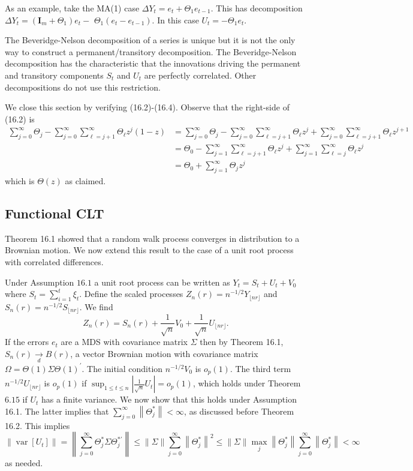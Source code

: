 \documentclass[10pt]{article}
\begin{document}
As an example, take the MA(1) case $\Delta Y_{t}=e_{t}+\Theta_{1} e_{t-1}$. This has decomposition $\Delta Y_{t}=\left(\boldsymbol{I}_{m}+\Theta_{1}\right) e_{t}-$ $\Theta_{1}\left(e_{t}-e_{t-1}\right)$. In this case $U_{t}=-\Theta_{1} e_{t}$.

The Beveridge-Nelson decomposition of a series is unique but it is not the only way to construct a permanent/transitory decomposition. The Beveridge-Nelson decomposition has the characteristic that the innovations driving the permanent and transitory components $S_{t}$ and $U_{t}$ are perfectly correlated. Other decompositions do not use this restriction.

We close this section by verifying (16.2)-(16.4). Observe that the right-side of (16.2) is
$$
\begin{aligned}
\sum_{j=0}^{\infty} \Theta_{j}-\sum_{j=0}^{\infty} \sum_{\ell=j+1}^{\infty} \Theta_{\ell} z^{j}(1-z) &=\sum_{j=0}^{\infty} \Theta_{j}-\sum_{j=0}^{\infty} \sum_{\ell=j+1}^{\infty} \Theta_{\ell} z^{j}+\sum_{j=0}^{\infty} \sum_{\ell=j+1}^{\infty} \Theta_{\ell} z^{j+1} \\
&=\Theta_{0}-\sum_{j=1}^{\infty} \sum_{\ell=j+1}^{\infty} \Theta_{\ell} z^{j}+\sum_{j=1}^{\infty} \sum_{\ell=j}^{\infty} \Theta_{\ell} z^{j} \\
&=\Theta_{0}+\sum_{j=1}^{\infty} \Theta_{j} z^{j}
\end{aligned}
$$
which is $\Theta(z)$ as claimed.

\subsection{Functional CLT}
Theorem 16.1 showed that a random walk process converges in distribution to a Brownian motion. We now extend this result to the case of a unit root process with correlated differences.

Under Assumption $16.1$ a unit root process can be written as $Y_{t}=S_{t}+U_{t}+V_{0}$ where $S_{t}=\sum_{i=1}^{t} \xi_{t}$. Define the scaled processes $Z_{n}(r)=n^{-1 / 2} Y_{\lfloor n r\rfloor}$ and $S_{n}(r)=n^{-1 / 2} S_{\lfloor n r\rfloor}$. We find
$$
Z_{n}(r)=S_{n}(r)+\frac{1}{\sqrt{n}} V_{0}+\frac{1}{\sqrt{n}} U_{\lfloor n r\rfloor} .
$$
If the errors $e_{t}$ are a MDS with covariance matrix $\Sigma$ then by Theorem 16.1, $S_{n}(r) \underset{d}{\longrightarrow} B(r)$, a vector Brownian motion with covariance matrix $\Omega=\Theta(1) \Sigma \Theta(1)^{\prime}$. The initial condition $n^{-1 / 2} V_{0}$ is $o_{p}(1)$. The third term $n^{-1 / 2} U_{\lfloor n r\rfloor}$ is $o_{p}(1)$ if $\sup _{1 \leq t \leq n}\left|\frac{1}{\sqrt{n}} U_{t}\right|=o_{p}(1)$, which holds under Theorem $6.15$ if $U_{t}$ has a finite variance. We now show that this holds under Assumption 16.1. The latter implies that $\sum_{j=0}^{\infty}\left\|\Theta_{j}^{*}\right\|<\infty$, as discussed before Theorem 16.2. This implies
$$
\left\|\operatorname{var}\left[U_{t}\right]\right\|=\left\|\sum_{j=0}^{\infty} \Theta_{j}^{*} \Sigma \Theta_{j}^{* \prime}\right\| \leq\|\Sigma\| \sum_{j=0}^{\infty}\left\|\Theta_{j}^{*}\right\|^{2} \leq\|\Sigma\| \max _{j}\left\|\Theta_{j}^{*}\right\| \sum_{j=0}^{\infty}\left\|\Theta_{j}^{*}\right\|<\infty
$$
as needed.
\end{document}
